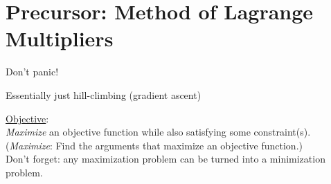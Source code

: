 \section{Precursor: Method of Lagrange Multipliers}


\begin{frame}
	\slidesonly{
	\begin{center}\Large
	\secname
	\end{center}
	\pause
	}
    \begin{center}
    \slidesonly{\huge}
	Don't panic!
    \end{center}
    \begin{center}
        Essentially just hill-climbing (gradient ascent)
    \end{center}
    \pause

\underline{Objective}: \\
\textit{Maximize} an objective function while also satisfying some constraint(s).\\
{
\small(\textit{Maximize}: Find the arguments that maximize an objective function.)
}\\

Don't forget: any maximization problem can be turned into a minimization problem.
\end{frame}

